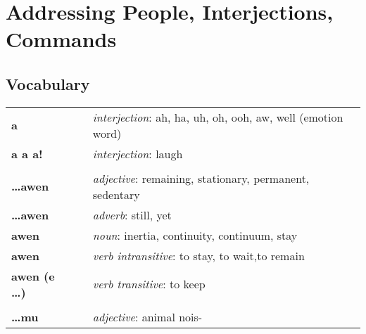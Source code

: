 \section{Addressing People, Interjections, Commands}
%
\subsection*{Vocabulary}
%
\begin{supertabular}{p{2,5cm}|ll}
    \textbf{a}               &  & \textit{interjection}: ah, ha, uh, oh, ooh, aw, well (emotion word)                 \\ %
    \textbf{a a a!}          &  & \textit{interjection}: laugh                                                        \\ %
                             &  &                                                                                     \\ %
    \textbf{\dots awen}      &  & \textit{adjective}: remaining, stationary, permanent, sedentary                     \\ %
    \textbf{\dots awen}      &  & \textit{adverb}: still, yet                                                         \\ %
    \textbf{awen}            &  & \textit{noun}: inertia, continuity, continuum, stay                                 \\ %
    \textbf{awen}            &  & \textit{verb intransitive}: to stay, to wait,to remain                              \\ %
    \textbf{awen (e \dots)}  &  & \textit{verb transitive}: to keep                                                   \\ %
                             &  &                                                                                     \\ %
    \textbf{\dots mu}        &  & \textit{adjective}: animal nois-                                                    \\ %

\end{supertabular}
